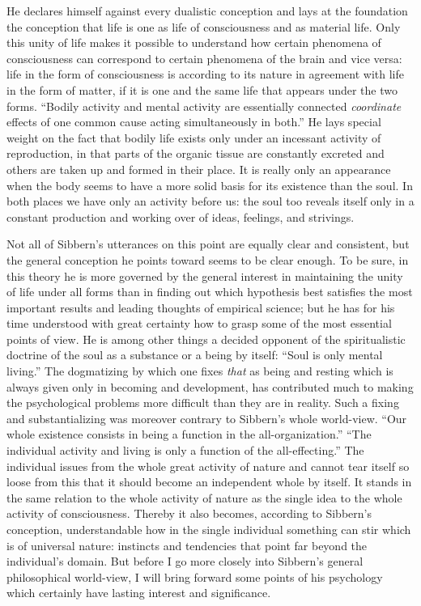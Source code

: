 \documentclass[12pt,a4paper,openany]{book}
\newcommand{\opage}[1]{\marginnote{\footnotesize\textit{[#1]}}}
\begin{document}
He declares himself against every dualistic conception and
lays at the foundation the conception that life is one as
life of consciousness and as material life. Only this unity of life makes
it possible to understand how certain
phenomena of consciousness can correspond to certain phenomena of the brain and vice versa:
life in the form of consciousness is according to its nature in
agreement with life in the form of matter, if it is one
\opage{81}and the same life that appears under the two forms.
``Bodily activity and mental activity are essentially
connected \emph{coordinate} effects of one common cause acting simultaneously in
both.'' He lays special weight on the fact that bodily life exists only under an incessant
activity of reproduction, in that parts of the organic
tissue are constantly excreted and others are taken up and formed in their place. It is
really only an appearance when the body seems to have a more solid
basis for its existence than the soul. In both places we have
only an activity before us: the soul too reveals itself only in a constant production and working over of
ideas, feelings, and strivings.

Not all of Sibbern's utterances on this point are equally
clear and consistent, but the general conception he
points toward seems to be clear enough. To be sure, in this
theory he is more governed by the general interest in
maintaining the unity of life under all forms than in finding out
which hypothesis best satisfies the
most important results and leading thoughts of empirical science; but he has for his
time understood with great certainty how to grasp some of the
most essential points of view. He is among other things a decided opponent of
the spiritualistic doctrine of the soul as a substance or
a being by itself: ``Soul is only mental living.'' The
dogmatizing by which one fixes \emph{that} as being and resting
which is always given only in becoming and development, has contributed
much to making the psychological problems more difficult than
they are in reality. Such a fixing and
substantializing was moreover contrary to Sibbern's whole world-view.
``Our whole existence consists in being a function in
the all-organization.'' ``The individual activity and living is only
a function of the all-effecting.'' The individual issues from the
whole great activity of nature and cannot tear itself so
loose from this that it should become an independent whole
by itself. It stands in the same relation to the whole activity of nature
as the single idea to the whole activity of consciousness.
Thereby it also becomes, according to Sibbern's conception,
understandable how in the single individual something can stir
which is of universal nature: instincts and tendencies that point
\opage{82}far beyond the individual's domain. But before I go more closely
into Sibbern's general philosophical world-view,
I will bring forward some points of his psychology which certainly
have lasting interest and significance.
\end{document}
